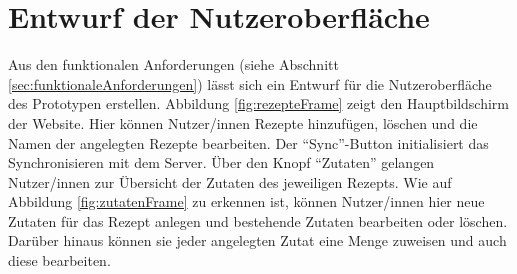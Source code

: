 \documentclass[a4paper, 12pt]{scrreprt}
\begin{document}
\section{Entwurf der Nutzeroberfläche}

Aus den funktionalen Anforderungen (siehe Abschnitt \ref{sec:funktionaleAnforderungen}) lässt sich ein Entwurf für die Nutzeroberfläche des Prototypen erstellen. Abbildung \ref{fig:rezepteFrame} zeigt den Hauptbildschirm der Website. Hier können Nutzer/innen Rezepte hinzufügen, löschen und die Namen der angelegten Rezepte bearbeiten. Der \enquote{Sync}-Button initialisiert das Synchronisieren mit dem Server. Über den Knopf \enquote{Zutaten} gelangen Nutzer/innen zur Übersicht der Zutaten des jeweiligen Rezepts. Wie auf Abbildung \ref{fig:zutatenFrame} zu erkennen ist, können Nutzer/innen hier neue Zutaten für das Rezept anlegen und bestehende Zutaten bearbeiten oder löschen. Darüber hinaus können sie jeder angelegten Zutat eine Menge zuweisen und auch diese bearbeiten. 
\end{document}
